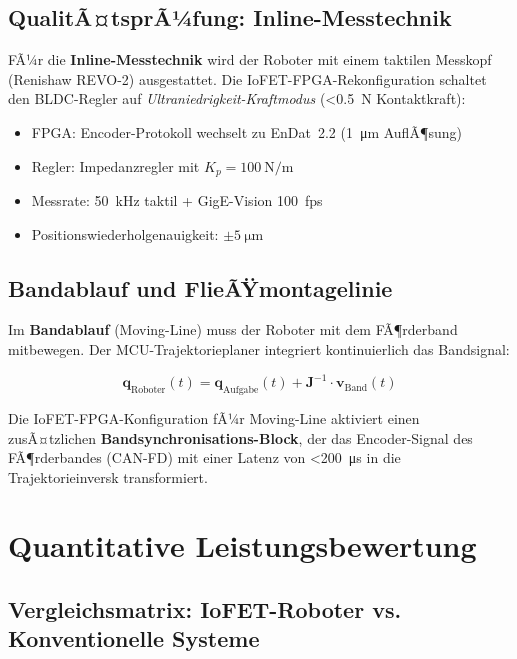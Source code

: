 ﻿\documentclass[a4paper,12pt]{scrreprt}
\theoremstyle{definition}
\begin{document}
\subsection{QualitÃ¤tsprÃ¼fung: Inline-Messtechnik}

FÃ¼r die \textbf{Inline-Messtechnik} wird der Roboter mit einem
taktilen Messkopf (Renishaw REVO-2) ausgestattet. Die
IoFET-FPGA-Rekonfiguration schaltet den BLDC-Regler auf
\emph{Ultraniedrigkeit-Kraftmodus} (\SI{<0.5}{\newton}
Kontaktkraft):

\begin{itemize}
  \item FPGA: Encoder-Protokoll wechselt zu EnDat~2.2 (\SI{1}{\micro\meter} AuflÃ¶sung)
  \item Regler: Impedanzregler mit $K_p = \SI{100}{\newton\per\meter}$
  \item Messrate: \SI{50}{\kilo\hertz} taktil + GigE-Vision 100~fps
  \item Positionswiederholgenauigkeit: $\pm\SI{5}{\micro\meter}$
\end{itemize}

\subsection{Bandablauf und FlieÃŸmontagelinie}

Im \textbf{Bandablauf} (Moving-Line) muss der Roboter mit dem
FÃ¶rderband mitbewegen. Der MCU-Trajektorieplaner integriert
kontinuierlich das Bandsignal:

\begin{equation}
  \mathbf{q}_{\text{Roboter}}(t) = \mathbf{q}_{\text{Aufgabe}}(t)
  + \mathbf{J}^{-1} \cdot \mathbf{v}_{\text{Band}}(t)
\end{equation}

Die IoFET-FPGA-Konfiguration fÃ¼r Moving-Line aktiviert einen
zusÃ¤tzlichen \textbf{Bandsyn\-chroni\-sations-Block}, der das
Encoder-Signal des FÃ¶rderbandes (CAN-FD) mit einer Latenz von
\SI{<200}{\micro\second} in die Trajektorieinversk transformiert.

\section{Quantitative Leistungsbewertung}

\subsection{Vergleichsmatrix: IoFET-Roboter vs. Konventionelle Systeme}
\end{document}
